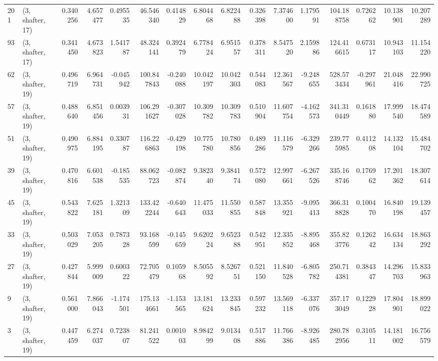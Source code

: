 \begin{tabular}{llrrrrrrrrrrrrrr}
201 &  (3, shafter, 17) &   0.340256 &   4.657477 &   0.495535 &    46.546340 &   0.414829 &   6.804468 &   6.822488 &  0.326398 &   7.374600 &   1.179591 &    104.188758 &   0.726262 &  10.138901 &   10.207289 \\
93  &  (3, shafter, 17) &   0.341450 &   4.673823 &   1.541787 &    48.324141 &   0.392479 &   6.778424 &   6.951557 &  0.378311 &   8.547520 &   2.159886 &    124.416615 &   0.673117 &  10.943103 &   11.154220 \\
62  &  (3, shafter, 19) &   0.496719 &   6.964731 &  -0.045942 &   100.847843 &  -0.240088 &  10.042197 &  10.042303 &  0.544083 &  12.361567 &  -9.248655 &    528.573434 &  -0.297961 &  21.048416 &   22.990725 \\
57  &  (3, shafter, 19) &   0.488640 &   6.851456 &   0.003931 &   106.291627 &  -0.307028 &  10.309782 &  10.309783 &  0.510904 &  11.607754 &  -4.162573 &    341.310449 &   0.161880 &  17.999540 &   18.474589 \\
51  &  (3, shafter, 19) &   0.490975 &   6.884195 &   0.330787 &   116.226863 &  -0.429198 &  10.775780 &  10.780856 &  0.489286 &  11.116579 &  -6.329266 &    239.775985 &   0.411208 &  14.132104 &   15.484702 \\
39  &  (3, shafter, 19) &   0.470816 &   6.601538 &  -0.185535 &    88.062723 &  -0.082874 &   9.382340 &   9.384174 &  0.572080 &  12.997661 &  -6.267526 &    335.168746 &   0.176962 &  17.201362 &   18.307614 \\
45  &  (3, shafter, 19) &   0.543822 &   7.625181 &   1.321309 &   133.422244 &  -0.640643 &  11.475033 &  11.550855 &  0.587848 &  13.355921 &  -9.095413 &    366.318828 &   0.100470 &  16.840198 &   19.139457 \\
33  &  (3, shafter, 19) &   0.503029 &   7.053205 &   0.787328 &    93.168599 &  -0.145659 &   9.620224 &   9.652388 &  0.542951 &  12.335852 &  -8.895468 &    355.823776 &   0.126242 &  16.634134 &   18.863292 \\
27  &  (3, shafter, 19) &   0.427844 &   5.999009 &   0.600322 &    72.705479 &   0.105968 &   8.505592 &   8.526751 &  0.521150 &  11.840528 &  -6.805782 &    250.714381 &   0.384347 &  14.296703 &   15.833963 \\
9   &  (3, shafter, 19) &   0.561000 &   7.866043 &  -1.174501 &   175.134661 &  -1.153565 &  13.181624 &  13.233845 &  0.597232 &  13.569118 &  -6.337076 &    357.173049 &   0.122928 &  17.804901 &   18.899022 \\
3   &  (3, shafter, 19) &   0.447459 &   6.274037 &   0.723807 &    81.241522 &   0.001003 &   8.984299 &   9.013408 &  0.517886 &  11.766386 &  -8.926485 &    280.782956 &   0.310511 &  14.181002 &   16.756579 \\

\end{tabular}
